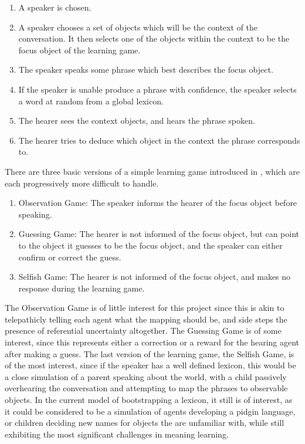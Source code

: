 \documentclass[a4paper,11pt]{article}
\begin{document}
\begin{enumerate}

\item A speaker is chosen.

\item A speaker chooses a set of objects which will be the context of the
conversation.  It then selects one of the objects within the context to be the
focus object of the learning game.

\item The speaker speaks some phrase which best describes the focus object.

\item If the speaker is unable produce a phrase with confidence, the
speaker selects a word at random from a global lexicon.

\item The hearer sees the context objects, and hears the phrase spoken.  

\item The hearer tries to deduce which object in the context the phrase
corresponds to.

\end{enumerate}

There are three basic versions of a simple learning game introduced in
\cite{VogtLearningSim}, which are each progressively more difficult to handle.

\begin{enumerate}

\item Observation Game: The speaker informs the hearer of the focus object before
speaking.

\item Guessing Game: The hearer is not informed of the focus object, but can
point to the object it guesses to be the focus object, and the speaker can either
confirm or correct the guess.

\item Selfish Game: The hearer is not informed of the focus object, and makes no
response during the learning game.

\end{enumerate}

The Observation Game is of little interest for this project since this is akin
to telepathicly telling each agent what the mapping should be, and side steps
the presence of referential uncertainty altogether.  The Guessing Game is of
some interest, since this represents either a correction or a reward for the
hearing agent after making a guess.  The last version of the learning game, the
Selfish Game, is of the most interest, since if the speaker has a well defined
lexicon, this would be a close simulation of a parent speaking about the world,
with a child passively overhearing the conversation and attempting to map the
phrases to observable objects.  In the current model of bootstrapping a lexicon,
it still is of interest, as it could be considered to be a simulation of agents
developing a pidgin language, or children deciding new names for objects the are
unfamiliar with, while still exhibiting the most significant challenges in
meaning learning.
\end{document}
